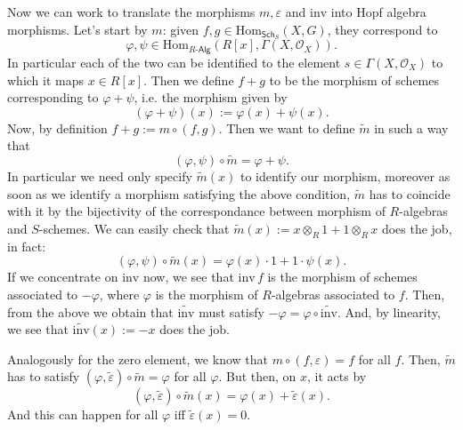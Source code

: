 \documentclass[../Main]{subfiles}
\begin{document}
\begin{ex}
\begin{enumerate}
			Now we can work to translate the morphisms $m, \varepsilon$ and $\mathrm{inv}$
			into Hopf algebra morphisms.
			Let's start by $m$:
			given $f,g \in \mathrm{Hom}_{\mathsf{Sch}_S} \left( X, G \right)$,
			they correspond to 
			\begin{equation}
			\varphi, \psi \in
			\mathrm{Hom}_{R \text{-}\mathsf{Alg}} 
			\left( R[x], \Gamma \left( X , \mathcal{O}_{ X } \right) \right)
			.\end{equation} 
			In particular each of the two can be identified to the element 
			$s \in \Gamma \left( X , \mathcal{O}_{ X } \right)$ to which
			it maps $x \in R[x]$.
			Then we define $f + g$ to be the morphism of schemes corresponding
			to $\varphi + \psi$, i.e. the morphism given by 
			\begin{equation}
				\left( \varphi + \psi \right)(x) :=
				\varphi (x) + \psi(x)
			.\end{equation} 
			Now, by definition $f + g := m \circ (f,g)$.
			Then we want to define $\widetilde{m}$ in such a way that
			\begin{equation}
			(\varphi, \psi) \circ \widetilde{m} = \varphi + \psi
			.\end{equation} 
			In particular we need only specify $\widetilde{m}(x)$ to identify our morphism,
			moreover as soon as we identify a morphism satisfying the above condition,
			$\widetilde{m}$ has to coincide with it by the bijectivity of the correspondance
			between morphism of $R$-algebras and $S$-schemes.
			We can easily check that $\widetilde{m}(x) := x \otimes_R 1 + 1 \otimes_R x$
			does the job, in fact:
			\begin{equation}
				(\varphi, \psi) \circ \widetilde{m} (x) =
				\varphi(x) \cdot 1 + 1 \cdot \psi(x)
			.\end{equation} 
			If we concentrate on $\mathrm{inv}$ now, we see that
			$\mathrm{inv}\, f$ is the morphism of schemes associated to
			$-\varphi$, where $\varphi$ is the morphism of $R$-algebras associated
			to $f$.
			Then, from the above we obtain that $\widetilde{\mathrm{inv}}$
			must satisfy $-\varphi = \varphi \circ \widetilde{\mathrm{inv}}$.
			And, by linearity, we see that $\widetilde{\mathrm{inv}}(x) := -x$ does the job.

			Analogously for the zero element, we know that $m \circ (f, \varepsilon) = f$
			for all $f$.
			Then, $\widetilde{m}$ has to satisfy $(\varphi, \widetilde{\varepsilon}) \circ
			\widetilde{m} = \varphi$ for all $\varphi$.
			But then, on $x$, it acts by
			\begin{equation}
				(\varphi, \widetilde{\varepsilon}) \circ \widetilde{m} (x) =
				\varphi(x) + \widetilde{\varepsilon}(x)
			.\end{equation} 
			And this can happen for all $\varphi$ iff $\widetilde{\varepsilon}(x) = 0$.


\end{enumerate}
\end{ex}
\end{document}
